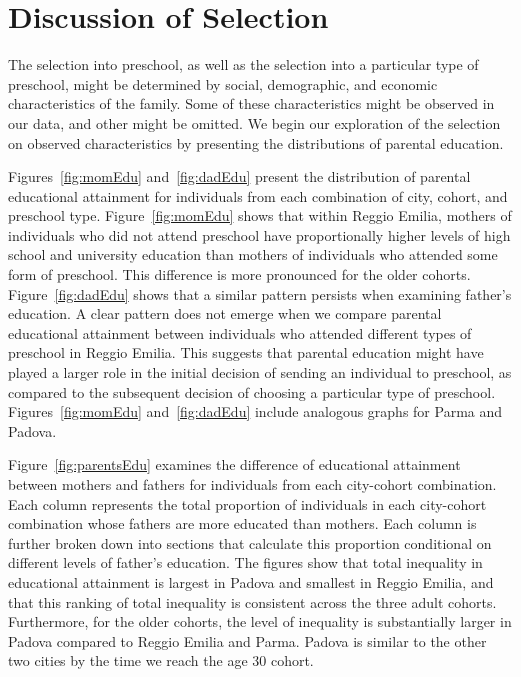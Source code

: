 

\section{Discussion of Selection}
\label{sec:selection}

The selection into preschool, as well as the selection into a particular type of preschool, might be determined by social, demographic, and economic characteristics of the family. Some of these characteristics might be observed in our data, and other might be omitted. We begin our exploration of the selection on observed characteristics by presenting the distributions of parental education.

Figures~\ref{fig:momEdu} and~\ref{fig:dadEdu} present the distribution of parental educational attainment for individuals from each combination of city, cohort, and preschool type. Figure~\ref{fig:momEdu} shows that within Reggio Emilia, mothers of individuals who did not attend preschool have proportionally higher levels of high school and university education than mothers of individuals who attended some form of preschool. This difference is more pronounced for the older cohorts. Figure~\ref{fig:dadEdu} shows that a similar pattern persists when examining father's education. A clear pattern does not emerge when we compare parental educational attainment between individuals who attended different types of preschool in Reggio Emilia. This suggests that parental education might have played a larger role in the initial decision of sending an individual to preschool, as compared to the subsequent decision of choosing a particular type of preschool. Figures~\ref{fig:momEdu} and~\ref{fig:dadEdu} include analogous graphs for Parma and Padova.

Figure~\ref{fig:parentsEdu} examines the difference of educational attainment between mothers and fathers for individuals from each city-cohort combination. Each column represents the total proportion of individuals in each city-cohort combination whose fathers are more educated than mothers. Each column is further broken down into sections that calculate this proportion conditional on different levels of father's education. The figures show that total inequality in educational attainment is largest in Padova and smallest in Reggio Emilia, and that this ranking of total inequality is consistent across the three adult cohorts. Furthermore, for the older cohorts, the level of inequality is substantially larger in Padova compared to Reggio Emilia and Parma. Padova is similar to the other two cities by the time we reach the age 30 cohort. 


